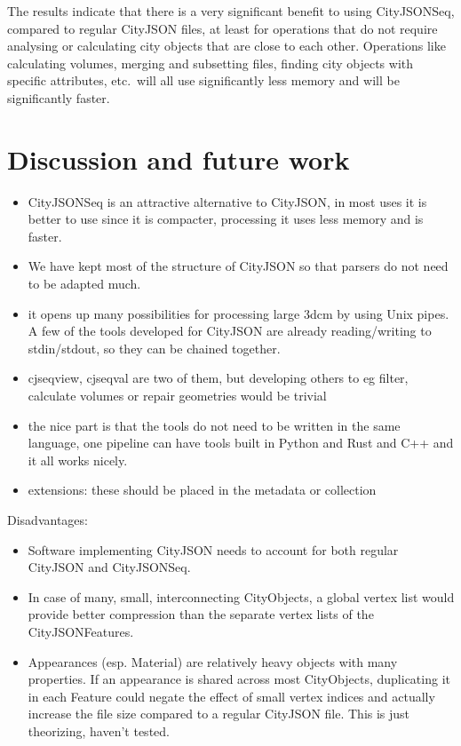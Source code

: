 \documentclass{isprs} %
\begin{document}
The results indicate that there is a very significant benefit to using CityJSONSeq, compared to regular CityJSON files, at least for operations that do not require analysing or calculating city objects that are close to each other.
Operations like calculating volumes, merging and subsetting files, finding city objects with specific attributes, etc.\ will all use significantly less memory and will be significantly faster.


%
\section{Discussion and future work}%
\label{sec:discussion}

\begin{itemize}
  \item CityJSONSeq is an attractive alternative to CityJSON, in most uses it is better to use since it is compacter, processing it uses less memory and is faster.
  \item We have kept most of the structure of CityJSON so that parsers do not need to be adapted much.
  \item it opens up many possibilities for processing large 3dcm by using Unix pipes. A few of the tools developed for CityJSON are already reading/writing to stdin/stdout, so they can be chained together.
  \item cjseqview, cjseqval are two of them, but developing others to eg filter, calculate volumes or repair geometries would be trivial
  \item the nice part is that the tools do not need to be written in the same language, one pipeline can have tools built in Python and Rust and C++ and it all works nicely.
  \item extensions: these should be placed in the metadata or collection
\end{itemize}

Disadvantages:
\begin{itemize}
  \item     Software implementing CityJSON needs to account for both regular CityJSON and CityJSONSeq.
  \item  In case of many, small, interconnecting CityObjects, a global vertex list would provide better compression than the separate vertex lists of the CityJSONFeatures.
  \item  Appearances (esp. Material) are relatively heavy objects with many properties. If an appearance is shared across most CityObjects, duplicating it in each Feature could negate the effect of small vertex indices and actually increase the file size compared to a regular CityJSON file. This is just theorizing, haven't tested.
\end{itemize}


{
	\begin{spacing}{1.17}
		\normalsize
	\end{spacing}
}
\end{document}
